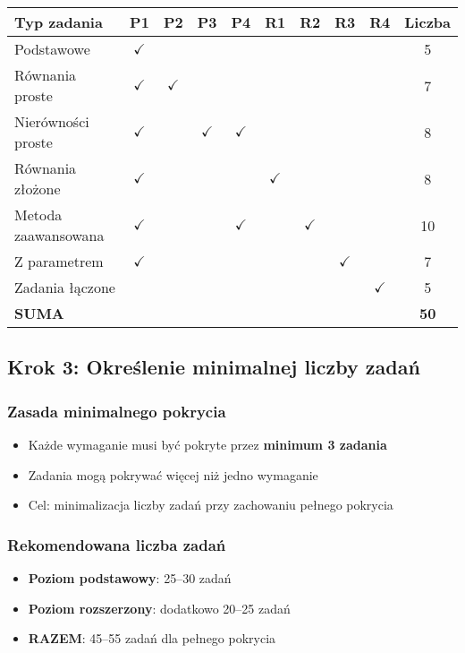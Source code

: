 \documentclass[12pt,a4paper]{article}
\begin{document}
\begin{table}[h]
\centering
\begin{tabular}{|l|c|c|c|c|c|c|c|c|c|}
\hline
\textbf{Typ zadania} & \textbf{P1} & \textbf{P2} & \textbf{P3} & \textbf{P4} & \textbf{R1} & \textbf{R2} & \textbf{R3} & \textbf{R4} & \textbf{Liczba} \\
\hline
Podstawowe & $\checkmark$ & & & & & & & & 5 \\
Równania proste & $\checkmark$ & $\checkmark$ & & & & & & & 7 \\
Nierówności proste & $\checkmark$ & & $\checkmark$ & $\checkmark$ & & & & & 8 \\
Równania złożone & $\checkmark$ & & & & $\checkmark$ & & & & 8 \\
Metoda zaawansowana & $\checkmark$ & & & $\checkmark$ & & $\checkmark$ & & & 10 \\
Z parametrem & $\checkmark$ & & & & & & $\checkmark$ & & 7 \\
Zadania łączone & & & & & & & & $\checkmark$ & 5 \\
\hline
\textbf{SUMA} & & & & & & & & & \textbf{50} \\
\hline
\end{tabular}
\end{table}

\subsection{Krok 3: Określenie minimalnej liczby zadań}

\subsubsection{Zasada minimalnego pokrycia}
\begin{itemize}
    \item Każde wymaganie musi być pokryte przez \textbf{minimum 3 zadania}
    \item Zadania mogą pokrywać więcej niż jedno wymaganie
    \item Cel: minimalizacja liczby zadań przy zachowaniu pełnego pokrycia
\end{itemize}

\subsubsection{Rekomendowana liczba zadań}
\begin{itemize}
    \item \textbf{Poziom podstawowy}: 25--30 zadań
    \item \textbf{Poziom rozszerzony}: dodatkowo 20--25 zadań
    \item \textbf{RAZEM}: 45--55 zadań dla pełnego pokrycia
\end{itemize}
\end{document}
